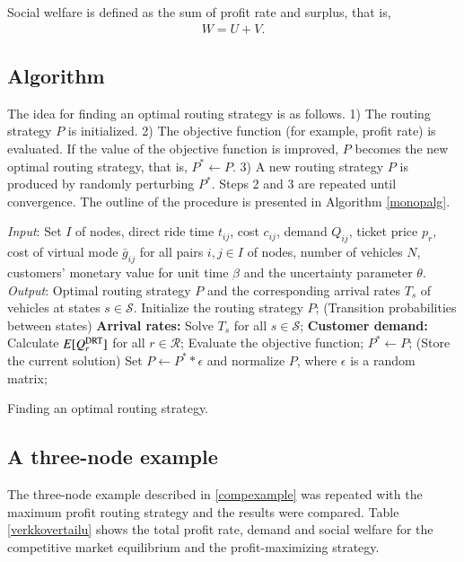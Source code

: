 \documentclass[dissertation,draft*]{aaltoseries}
\begin{document}
Social welfare is defined as the sum of profit rate and surplus, that is, 
\begin{align}
\label{monopwelfare}
 W=U+V.
\end{align}

\subsection{Algorithm}
The idea for finding an optimal routing strategy is as follows.
1) The routing strategy $P$ is initialized. 
2) The objective function (for example, profit rate) is evaluated. 
If the value of the objective function is improved, $P$ becomes the new optimal routing strategy, that is, $P^* \leftarrow P$.
3) A new routing strategy $P$ is produced by randomly perturbing $P^*$.
Steps 2 and 3 are repeated until convergence.
The outline of the procedure is presented in Algorithm \ref{monopalg}.

\begin{algorithm}[H]
\begin{algorithmic}
\STATE \emph{Input}: Set $I$ of nodes, direct ride time $t_{ij}$, cost $c_{ij}$, demand $Q_{ij}$,
ticket price $p_{r}$, cost of virtual mode $\bar{g}_{ij}$ 
for all pairs $i,j \in I$ of nodes, number of vehicles $N$, 
customers' monetary value for unit time $\beta$
and the uncertainty parameter $\theta$.
\STATE \emph{Output}: Optimal routing strategy $P$ and the corresponding arrival rates $T_s$ of 
vehicles at states $s \in \mathcal{S}$.
\STATE Initialize the routing strategy $P$; \hfill (Transition probabilities between states) 
\REPEAT
\STATE \textbf{Arrival rates:} Solve $T_s$ for all $s \in \mathcal{S}$;
\STATE \textbf{Customer demand:} Calculate $E[Q_{r}^{\rm DRT}]$ for all 
$r \in \mathcal{R}$;
\STATE Evaluate the objective function;
\STATE $P^* \leftarrow P$; \hfill (Store the current solution)
\ENDIF
\STATE Set $P \leftarrow P^* * \epsilon$ and normalize $P$, 
where $\epsilon$ is a random matrix; 
\end{algorithmic}
\caption{Finding an optimal routing strategy.}
\label{monopalg}
\end{algorithm}

\subsection{A three-node example}
The three-node example described in \ref{compexample} was repeated with the maximum profit routing strategy and 
the results were compared. Table \ref{verkkovertailu} shows the total profit rate, demand and social welfare for 
the competitive market equilibrium and the profit-maximizing strategy.
\end{document}
